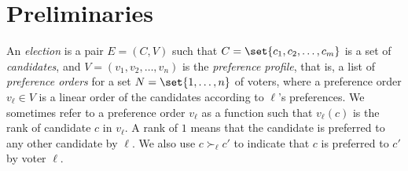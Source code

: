 \documentclass[letterpaper]{article} %
\newcommand{\Bribery}{\textsc{Bribery}}
\newcommand{\swapB}{\textsc{Swap Bribery}}
\newcommand{\shiftB}{\textsc{Shift Bribery}}
\begin{document}





\section{Preliminaries}
An \emph{election} is a pair $E=(C, V)$ such that $C=\set{c_1, c_2, \ldots, c_m}$ is a set of \emph{candidates}, and  $V = \left(v_1, v_2, \ldots, v_n\right)$ is the \emph{preference profile}, that is, a list of \emph{preference orders} for a set $N=\set{1,\ldots,n}$ of voters, where a preference order $v_\ell \in V$ is a linear order of the candidates according to $\ell$'s preferences. 
 We sometimes refer to a preference order $v_\ell$ as a function such that $v_\ell(c)$ is the rank of candidate $c$ in $v_\ell$. A rank of $1$ means that the candidate is preferred to any other candidate by $\ell$. We also use $c \succ_\ell c'$ to indicate that $c$ is preferred to $c'$ by voter $\ell$.
\end{document}

